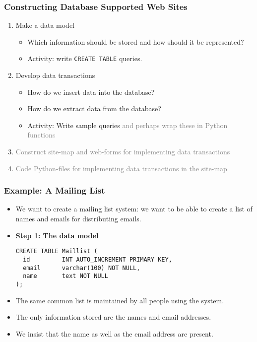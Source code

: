 \documentclass[dvipsnames]{beamer}
\begin{document}
\begin{frame}
\frametitle{Constructing Database Supported Web Sites} 

\begin{enumerate}[Step 1:]
  \item Make a data model
    \begin{itemize}
    \item Which information should be stored and how should it be
      represented?
    \item Activity: write \texttt{CREATE TABLE} queries.
    \end{itemize}


  \item Develop data transactions
    \begin{itemize}
    \item How do we insert data into the database?
    \item How do we extract data from the database?
    \item Activity: Write sample \sql{} queries \textcolor{gray}{and perhaps wrap these
      in Python functions}
    \end{itemize}


  \item \textcolor{gray}{Construct site-map and web-forms for implementing data transactions}



  \item \textcolor{gray}{Code Python-files for implementing data transactions in the
    site-map}

\end{enumerate}
\end{frame}



\begin{frame}[fragile=singleslide]
\frametitle{Example: A Mailing List} 

\begin{itemize}
\item We want to create a mailing list system: we want to be able to
  create a list of names and emails for distributing emails.

\item \textbf{Step 1: The data model}

\begin{small}
\begin{verbatim}
CREATE TABLE Maillist (
  id         INT AUTO_INCREMENT PRIMARY KEY,
  email      varchar(100) NOT NULL,
  name       text NOT NULL
);
\end{verbatim}
\end{small}

\item The same common list is maintained by all people using the system.

\item The only information stored are the names and email addresses.

\item We insist that the name as well as the email address are present.
\end{itemize}
\end{frame}
\end{document}
